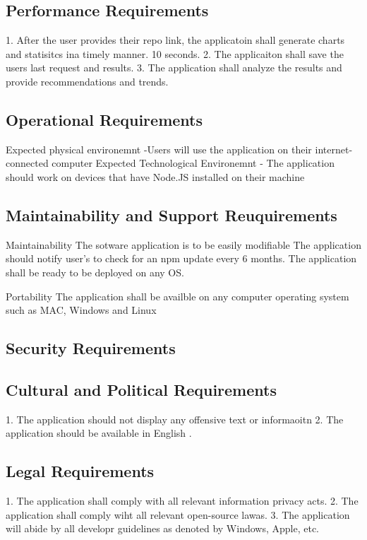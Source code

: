 \documentclass{article}
\begin{document}
\subsection{Performance Requirements}
1. After the user provides their repo link, the applicatoin shall generate charts and statisitcs ina timely manner.  10 seconds. 
2. The applicaiton shall save the users last request and results. 
3. The application shall analyze the results and provide recommendations and trends. 

\subsection{Operational Requirements}
Expected physical environemnt 
-Users will use the application on their internet-connected computer 
Expected Technological Environemnt 
- The application should work on devices that have Node.JS installed on their machine 

\subsection{Maintainability and Support Reuquirements}
Maintainability 
The sotware application is to be easily modifiable
The application should notify user's to check for an npm update every 6 months. 
The application shall be ready to be deployed on any OS. 

Portability 
The application shall be availble on any computer operating system such as MAC, Windows and Linux

\subsection{Security Requirements}
\subsection{Cultural and Political Requirements}
1. The application should not display any offensive text or informaoitn 
2. The application should be available in English . 

\subsection{Legal Requirements}
1. The application shall comply with all relevant information privacy acts.
2. The application shall comply wiht all relevant open-source lawas. 
3.  The application will abide by all developr guidelines as denoted by Windows, Apple, etc. 
\end{document}
